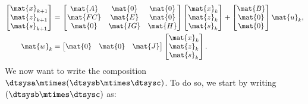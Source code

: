 \begin{equation*}
    \label{eq:dlin-5}
    \begin{aligned}
        \begin{bmatrix}
            \mat{x}_{k+1} \\
            \mat{z}_{k+1} \\
            \mat{s}_{k+1}
        \end{bmatrix} & =
        \begin{bmatrix}
            \mat{A}  & \mat{0}  & \mat{0} \\
            \mat{FC} & \mat{E}  & \mat{0} \\
            \mat{0}  & \mat{IG} & \mat{H}
        \end{bmatrix}
        \begin{bmatrix}
            \mat{x}_k \\ \mat{z}_k\\ \mat{s}_k
        \end{bmatrix}+
        \begin{bmatrix}
            \mat{B} \\ \mat{0}\\ \mat{0}
        \end{bmatrix}\mat{u}_k, \\
        \mat{w}_k                         & =
        \begin{bmatrix}
            \mat{0} & \mat{0} & \mat{J}
        \end{bmatrix}
        \begin{bmatrix}
            \mat{x}_k \\ \mat{z}_k\\ \mat{s}_k
        \end{bmatrix}.
    \end{aligned}
\end{equation*}
We now want to write the composition~$\dtsysa\mtimes (\dtsysb\mtimes \dtsysc)$.
To do so, we start by writing~$(\dtsysb\mtimes \dtsysc)$ as:
